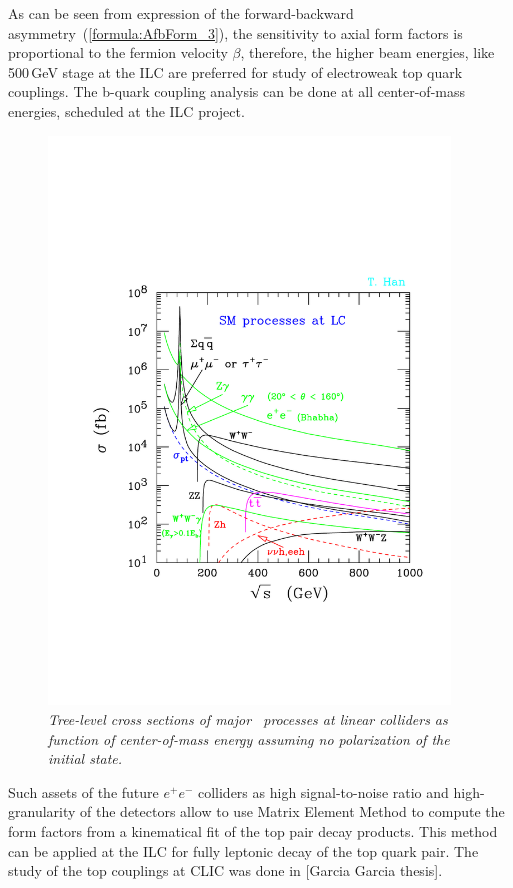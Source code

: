 As can be seen from expression of the forward-backward asymmetry~(\ref{formula:AfbForm_3}), the sensitivity to axial form factors is proportional to the fermion velocity $\beta$, therefore, the higher beam energies, like 500\,GeV stage at the ILC are preferred for study of electroweak top quark couplings. 
The b-quark coupling analysis can be done at all center-of-mass energies, scheduled at the ILC project.
\begin{figure}[h]
{\centering
    \includegraphics[clip, trim=0.5cm 5cm 0.5cm 7cm, width=0.95\textwidth]{ILD/graphics/epem_sm-hepph.pdf}
    \caption{\sl Tree-level cross sections of major \sm\ processes at linear colliders as function of center-of-mass energy assuming no polarization of the initial state.}
    \label{fig:LCcrosssection}
  }
\end{figure}


Such assets of the future $e^+e^-$ colliders as high signal-to-noise ratio and high-granularity of the detectors allow to use Matrix Element Method to compute the form factors from a kinematical fit of the top pair decay products. 
This method can be applied at the ILC for fully leptonic decay of the top quark pair. 
The study of the top couplings at CLIC was done in [Garcia Garcia thesis]. 

